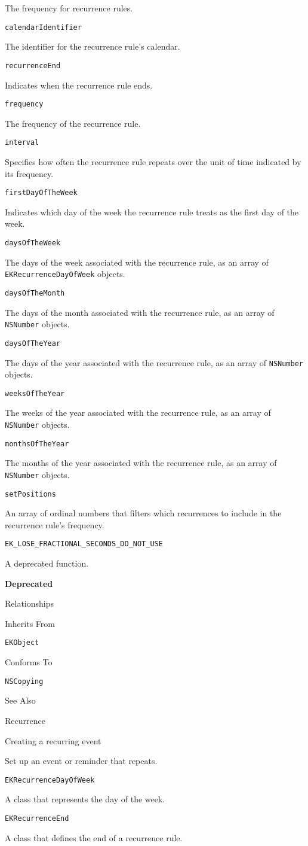 \documentclass{article}
\begin{document}
The frequency for recurrence rules.

\texttt{calendarIdentifier}

The identifier for the recurrence rule's calendar.

\texttt{recurrenceEnd}

Indicates when the recurrence rule ends.

\texttt{frequency}

The frequency of the recurrence rule.

\texttt{interval}

Specifies how often the recurrence rule repeats over the unit of time indicated by its frequency.

\texttt{firstDayOfTheWeek}

Indicates which day of the week the recurrence rule treats as the first day of the week.

\texttt{daysOfTheWeek}

The days of the week associated with the recurrence rule, as an array of \texttt{EKRecurrenceDayOfWeek} objects.

\texttt{daysOfTheMonth}

The days of the month associated with the recurrence rule, as an array of \texttt{NSNumber} objects.

\texttt{daysOfTheYear}

The days of the year associated with the recurrence rule, as an array of \texttt{NSNumber} objects.

\texttt{weeksOfTheYear}

The weeks of the year associated with the recurrence rule, as an array of \texttt{NSNumber} objects.

\texttt{monthsOfTheYear}

The months of the year associated with the recurrence rule, as an array of \texttt{NSNumber} objects.

\texttt{setPositions}

An array of ordinal numbers that filters which recurrences to include in the recurrence rule's frequency.

\texttt{EK\_LOSE\_FRACTIONAL\_SECONDS\_DO\_NOT\_USE}

A deprecated function.

\textbf{Deprecated}

Relationships

Inherits From

\texttt{EKObject}

Conforms To

\texttt{NSCopying}

See Also

Recurrence

Creating a recurring event

Set up an event or reminder that repeats.

\texttt{EKRecurrenceDayOfWeek}

A class that represents the day of the week.

\texttt{EKRecurrenceEnd}

A class that defines the end of a recurrence rule.

\newpage
\end{document}
